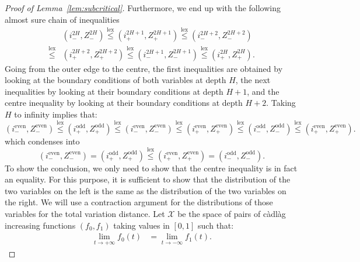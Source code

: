 \documentclass[11pt]{article}
\DeclareMathOperator{\lex}{lex}
\begin{document}
\begin{proof}[Proof of Lemma~\ref{lem:subcritical}]
Furthermore, we end up with the following almost sure  chain of inequalities
\begin{align*} 
&(i_-^{2H},Z_{-}^{2H}) \overset{\lex}{\leq} (i_{+}^{2H+1},Z_{+}^{2H+1}) \overset{\lex}{\leq } (i_-^{2H+2},Z_{-}^{2H+2}) \\ \overset{\lex}{\leq} &(i_+^{2H+2},Z_{+}^{2H+2}) \overset{\lex}{\leq}(i_-^{2H+1},Z_{-}^{2H+1}) \overset{\lex}{\leq}(i_+^{2H},Z_{+}^{2H}).    
\end{align*}
Going from the outer edge to the centre, the first inequalities are obtained by looking at the boundary conditions of both variables at depth $H$, the next inequalities by looking at their boundary conditions at depth $H+1$, and the centre inequality by looking at their boundary conditions at depth $H+2$. Taking $H$ to infinity implies that:
\[  (i_{-}^{\text{even}},Z_{-}^{\text{even}}) \overset{\lex}{\leq} (i_{+}^{
    \text{odd}},Z_{+}^{\text{odd}})\overset{\lex}{\leq}  (i_{-}^{\text{even}},Z_{-}^{\text{even}}) \overset{\lex}{\leq} (i_{+}^{\text{even}},Z_{+}^{\text{even}})\overset{\lex}{\leq} (i_{-}^{
    \text{odd}},Z_{-}^{
    \text{odd}})\overset{\lex}{\leq} (i_{+}^{\text{even}},Z_{+}^{\text{even}}) .  \]
which condenses into
\[ (i_{-}^{\text{even}},Z_{-}^{\text{even}}) = (i_{+}^{
    \text{odd}},Z_{+}^{\text{odd}})\overset{\lex}{\leq} (i_{+}^{\text{even}},Z_{+}^{\text{even}})=(i_{-}^{
    \text{odd}},Z_{-}^{
    \text{odd}}).   \]
To show the conclusion, we only need to show that the centre inequality is in fact an equality. For this purpose, it is sufficient to show that the distribution of the two variables on the left is the same as the distribution of the two variables on the right.
We will use a contraction argument for the distributions of those variables for the total variation distance.
Let $\mathcal X$ be the space of pairs of c\`adl\`ag increasing functions $(f_0,f_1)$ taking values in $[0,1]$ such that:
    \begin{align*}
        \lim_{t \rightarrow +\infty} f_0(t)&= \lim_{t \rightarrow -\infty} f_1(t).
    \end{align*}


\end{proof}
\end{document}

